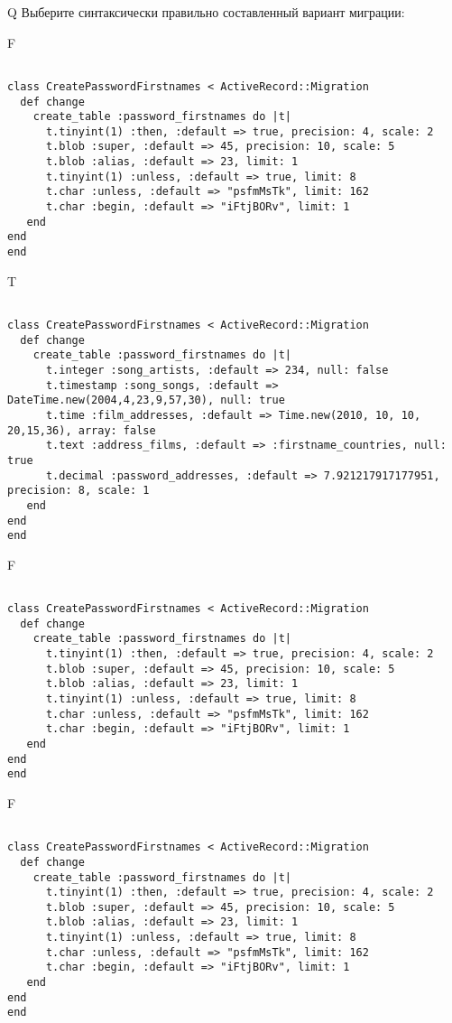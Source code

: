 Q
Выберите синтаксически правильно составленный вариант миграции:

F
\begin{verbatim}
		
class CreatePasswordFirstnames < ActiveRecord::Migration 
  def change 
    create_table :password_firstnames do |t| 
      t.tinyint(1) :then, :default => true, precision: 4, scale: 2
      t.blob :super, :default => 45, precision: 10, scale: 5
      t.blob :alias, :default => 23, limit: 1
      t.tinyint(1) :unless, :default => true, limit: 8
      t.char :unless, :default => "psfmMsTk", limit: 162
      t.char :begin, :default => "iFtjBORv", limit: 1
   end
end
end
\end{verbatim}

T
\begin{verbatim}
		
class CreatePasswordFirstnames < ActiveRecord::Migration 
  def change 
    create_table :password_firstnames do |t| 
      t.integer :song_artists, :default => 234, null: false
      t.timestamp :song_songs, :default => DateTime.new(2004,4,23,9,57,30), null: true
      t.time :film_addresses, :default => Time.new(2010, 10, 10, 20,15,36), array: false
      t.text :address_films, :default => :firstname_countries, null: true
      t.decimal :password_addresses, :default => 7.921217917177951, precision: 8, scale: 1
   end
end
end
\end{verbatim}

F
\begin{verbatim}
		
class CreatePasswordFirstnames < ActiveRecord::Migration 
  def change 
    create_table :password_firstnames do |t| 
      t.tinyint(1) :then, :default => true, precision: 4, scale: 2
      t.blob :super, :default => 45, precision: 10, scale: 5
      t.blob :alias, :default => 23, limit: 1
      t.tinyint(1) :unless, :default => true, limit: 8
      t.char :unless, :default => "psfmMsTk", limit: 162
      t.char :begin, :default => "iFtjBORv", limit: 1
   end
end
end
\end{verbatim}

F
\begin{verbatim}
		
class CreatePasswordFirstnames < ActiveRecord::Migration 
  def change 
    create_table :password_firstnames do |t| 
      t.tinyint(1) :then, :default => true, precision: 4, scale: 2
      t.blob :super, :default => 45, precision: 10, scale: 5
      t.blob :alias, :default => 23, limit: 1
      t.tinyint(1) :unless, :default => true, limit: 8
      t.char :unless, :default => "psfmMsTk", limit: 162
      t.char :begin, :default => "iFtjBORv", limit: 1
   end
end
end
\end{verbatim}


